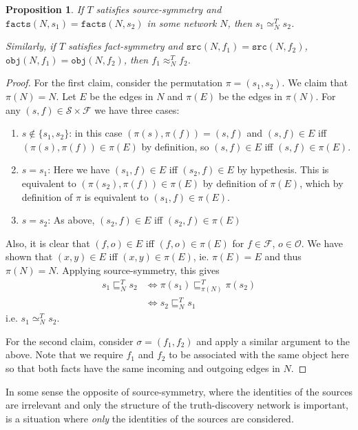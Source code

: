 \documentclass{article}
\theoremstyle{definition} \newtheorem{definition}{Definition}
\theoremstyle{definition} \newtheorem{example}{Example}
\theoremstyle{plain} \newtheorem{axiom}{Axiom}
\theoremstyle{plain} \newtheorem*{remark}{Remark}
\theoremstyle{remark} \newtheorem*{notation}{Notation}
\theoremstyle{plain} \newtheorem{lemma}{Lemma}
\theoremstyle{plain} \newtheorem{proposition}{Proposition}
\renewcommand{\S}{\mathcal{S}}  %
\renewcommand{\O}{\mathcal{O}}  %
\newcommand{\F}{\mathcal{F}}
\newcommand{\sle}{\sqsubseteq}
\newcommand{\seq}{\simeq}
\newcommand{\feq}{\approx}
\newcommand{\src}{\texttt{src}}
\newcommand{\fact}{\texttt{facts}}
\newcommand{\obj}{\texttt{obj}}
\begin{document}
\begin{proposition}
If $T$ satisfies source-symmetry and $\fact(N, s_1) = \fact(N, s_2)$ in some
network $N$, then $s_1 \seq_N^T s_2$.

Similarly, if $T$ satisfies fact-symmetry and $\src(N, f_1) = \src(N, f_2)$,
$\obj(N, f_1) = \obj(N, f_2)$, then $f_1 \feq_N^T f_2$.
\end{proposition}

\begin{proof}
For the first claim, consider the permutation $\pi = (s_1, s_2)$. We claim that
$\pi(N) = N$. Let $E$ be the edges in $N$ and $\pi(E)$ be the edges in
$\pi(N)$. For any $(s, f) \in \S \times \F$ we have three cases:
\begin{enumerate}
\item $s \notin \{s_1, s_2\}$: in this case $(\pi(s), \pi(f)) = (s, f)$ and
$(s, f) \in E$ iff $(\pi(s), \pi(f)) \in \pi(E)$ by definition, so
$(s, f) \in E$ iff $(s, f) \in \pi(E)$.

\item $s=s_1$: Here we have $(s_1, f) \in E$ iff $(s_2, f) \in E$ by
hypethesis. This is equivalent to $(\pi(s_2), \pi(f)) \in \pi(E)$ by definition
of $\pi(E)$, which by definition of $\pi$ is equivalent to $(s_1, f) \in
\pi(E)$.

\item $s=s_2$: As above, $(s_2, f) \in E$ iff $(s_2, f) \in \pi(E)$
\end{enumerate}
Also, it is clear that $(f, o) \in E$ iff $(f, o) \in \pi(E)$ for $f \in \F$,
$o \in \O$. We have shown that $(x, y) \in E$ iff $(x, y) \in \pi(E)$, ie.
$\pi(E) = E$ and thus $\pi(N) = N$. Applying source-symmetry, this gives
\begin{align*}
    s_1 \sle_N^T s_2 & \iff \pi(s_1) \sle_{\pi(N)}^T \pi(s_2) \\
                     & \iff s_2 \sle_N^T s_1
\end{align*}
i.e. $s_1 \seq_N^T s_2$.

For the second claim, consider $\sigma = (f_1, f_2)$ and apply a similar
argument to the above. Note that we require $f_1$ and $f_2$ to be associated
with the same object here so that both facts have the same incoming and outgoing
edges in $N$.
\end{proof}

In some sense the opposite of source-symmetry, where the identities of the
sources are irrelevant and only the structure of the truth-discovery network is
important, is a situation where \emph{only} the identities of the sources are
considered.
\end{document}
